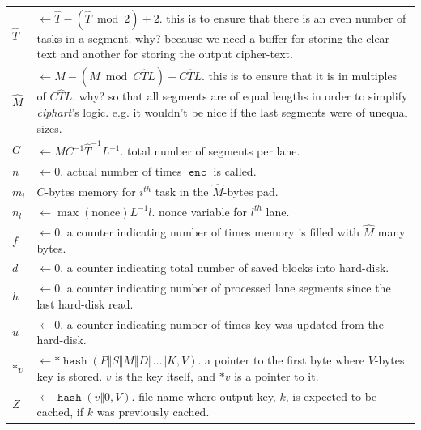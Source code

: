 \documentclass[twocolumn]{article}
\DeclareMathOperator{\enc}{\mathtt{enc}}
\DeclareMathOperator{\maxf}{max}
\DeclareMathOperator{\hash}{\mathtt{hash}}
\begin{document}
\begin{tabularx}{\columnwidth}{lX}
    $\hat T$    & $\gets \hat T - (\hat T \bmod 2) + 2$.  this is to ensure
                    that there is an even number of tasks in a segment.
                    why?  because we need a buffer for storing the
                    clear-text and another for storing the output
                    cipher-text.\\
    $\hat M$    & $\gets M - (M \bmod C\hat TL) + C\hat TL$.  this is to
                    ensure that it is in multiples of $C\hat TL$.  why?  so
                    that all segments are of equal lengths in order to
                    simplify \emph{ciphart}'s logic.  e.g. it wouldn't be
                    nice if the last segments were of unequal sizes.\\
    $G$         & $\gets \hat MC^{-1}\hat T^{-1}L^{-1}$.  total number of
                    segments per lane.\\
    $n$    & $\gets 0$.  actual number of times $\enc$ is called.\\
    $m_i$       & $C$-bytes memory for $i^{th}$ task in the $\hat M$-bytes
                    pad.\\
    $n_l$       & $\gets \maxf(\text{nonce})L^{-1}l$.  nonce variable for $l^{th}$ lane.\\
    $f$         & $\gets 0$.  a counter indicating number of times
                    memory is filled with $\hat M$ many bytes.\\
    $d$         & $\gets 0$.  a counter indicating total number of saved
                    blocks into hard-disk.\\
    $h$         & $\gets 0$.  a counter indicating number of processed lane
                    segments since the last hard-disk read.\\
    $u$         & $\gets 0$.  a counter indicating number of times key was
                    updated from the hard-disk.\\
    $*v$         & $\gets *\hash(P \Vert S \Vert M \Vert D \Vert \ldots
                    \Vert K, V)$.  a pointer to the first byte where
                    $V$-bytes key is stored.  $v$ is the key itself, and
                    $*v$ is a pointer to it.\\
    $Z$         & $\gets \hash(v \Vert 0, V)$.  file name where output key,
                    $k$, is expected to be cached, if $k$ was previously
                    cached.\\
\end{tabularx}
\end{document}
